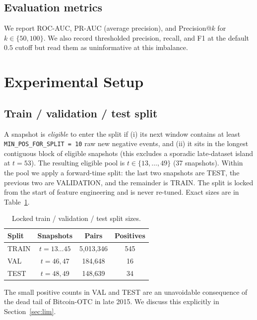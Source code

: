 \documentclass[conference]{IEEEtran}
\newcommand{\code}[1]{\texttt{#1}}
\begin{document}
\subsection{Evaluation metrics}
We report ROC-AUC, PR-AUC (average precision), and Precision@$k$ for
$k \in \{50, 100\}$. We also record thresholded precision, recall, and
F1 at the default $0.5$ cutoff but read them as uninformative at this
imbalance.

\section{Experimental Setup}\label{sec:setup}

\subsection{Train / validation / test split}
A snapshot is \emph{eligible} to enter the split if (i) its next
window contains at least \code{MIN\_POS\_FOR\_SPLIT = 10} raw new
negative events, and (ii) it sits in the longest contiguous block of
eligible snapshots (this excludes a sporadic late-dataset island at
$t = 53$). The resulting eligible pool is $t \in \{13, \dots, 49\}$
(37 snapshots). Within the pool we apply a forward-time split: the
last two snapshots are TEST, the previous two are VALIDATION, and the
remainder is TRAIN. The split is locked from the start of feature
engineering and is never re-tuned. Exact sizes are in
Table~\ref{tab:split}.

\begin{table}[t]
\caption{Locked train / validation / test split sizes.}
\label{tab:split}
\centering
\begin{tabular}{lccc}
\toprule
Split & Snapshots & Pairs & Positives \\
\midrule
TRAIN & $t = 13 \dots 45$ & 5{,}013{,}346 & 545 \\
VAL   & $t = 46, 47$      &   184{,}648   &  16 \\
TEST  & $t = 48, 49$      &   148{,}639   &  34 \\
\bottomrule
\end{tabular}
\end{table}

The small positive counts in VAL and TEST are an unavoidable
consequence of the dead tail of Bitcoin-OTC in late 2015. We discuss
this explicitly in Section~\ref{sec:lim}.
\end{document}
